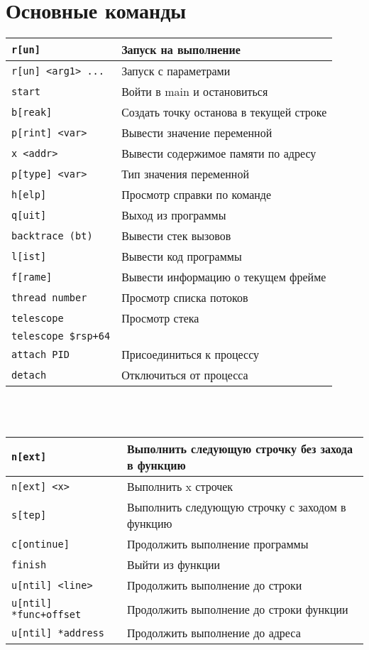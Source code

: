 \section{Основные команды}

\begin{tabular}{|l|l|}
	\hline \texttt{r[un] } & Запуск на выполнение \\
	\hline \texttt{r[un] <arg1> ...} & Запуск с параметрами \\ 
	\hline \texttt{start} & Войти в main и остановиться \\
	\hline \texttt{b[reak]} & Создать точку останова в текущей строке \\
	\hline \texttt{p[rint] <var>} & Вывести значение переменной \\
	\hline \texttt{x <addr>} & Вывести содержимое памяти по адресу \\
	\hline \texttt{p[type] <var>} & Тип значения переменной \\
	\hline \texttt{h[elp]} & Просмотр справки по команде \\
	\hline \texttt{q[uit]} & Выход из программы \\
	\hline \texttt{backtrace (bt)}  & Вывести стек вызовов \\
	\hline \texttt{l[ist]} & Вывести код программы \\
	\hline \texttt{f[rame]} & Вывести информацию о текущем фрейме \\  
	\hline \texttt{thread number} & Просмотр списка потоков \\
	\hline \texttt{telescope} &  Просмотр стека \\
	\hline \texttt{telescope \$rsp+64} &  \\
	\hline \texttt{attach PID} & Присоединиться к процессу \\ 
	\hline \texttt{detach} & Отключиться от процесса \\
	\hline
\end{tabular} \\
\\

\begin{tabular}{|l|l|}
	\hline \texttt{n[ext]} & Выполнить следующую строчку без захода в функцию \\	
	\hline \texttt{n[ext] <x>} & Выполнить x строчек \\
	\hline \texttt{s[tep]} & Выполнить следующую строчку с заходом в функцию \\
	\hline \texttt{c[ontinue]} & Продолжить выполнение программы \\
	\hline \texttt{finish} & Выйти из функции \\
	\hline \texttt{u[ntil] <line> } & Продолжить выполнение до строки \\
	\hline \texttt{u[ntil] *func+offset} & Продолжить выполнение до строки функции\\
	\hline \texttt{u[ntil] *address} & Продолжить выполнение до адреса\\

	\hline	
\end{tabular} \\
\\

